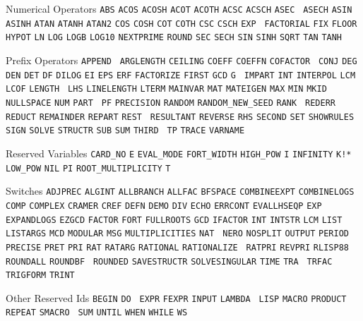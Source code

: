 \begin{list}{}
\item[Numerical Operators] {\tt ABS} {\tt ACOS}
{\tt ACOSH} {\tt ACOT} {\tt ACOTH} {\tt ACSC} {\tt ACSCH} {\tt ASEC} {\tt
ASECH} {\tt ASIN} {\tt ASINH} {\tt ATAN} {\tt ATANH} {\tt ATAN2} {\tt COS}
{\tt COSH} {\tt COT} {\tt COTH} {\tt CSC} {\tt CSCH} {\tt EXP} {\tt
FACTORIAL} {\tt FIX} {\tt FLOOR} {\tt HYPOT} {\tt LN} {\tt LOG} {\tt LOGB}
{\tt LOG10} {\tt NEXTPRIME} {\tt ROUND} {\tt SEC} {\tt SECH} {\tt SIN}
{\tt SINH} {\tt SQRT} {\tt TAN} {\tt TANH}

\item[Prefix Operators] {\tt APPEND} {\tt
ARGLENGTH} {\tt CEILING} {\tt COEFF} {\tt COEFFN} {\tt COFACTOR} {\tt
CONJ} {\tt DEG} {\tt DEN} {\tt DET} {\tt DF} {\tt DILOG} {\tt EI}
{\tt EPS} {\tt ERF} {\tt FACTORIZE} {\tt FIRST} {\tt GCD} {\tt G} {\tt
IMPART} {\tt INT} {\tt INTERPOL} {\tt LCM} {\tt LCOF} {\tt LENGTH} {\tt
LHS} {\tt LINELENGTH} {\tt LTERM} {\tt MAINVAR} {\tt MAT} {\tt MATEIGEN}
{\tt MAX} {\tt MIN} {\tt MKID} {\tt NULLSPACE} {\tt NUM} {\tt PART} {\tt
PF} {\tt PRECISION} {\tt RANDOM} {\tt RANDOM\_NEW\_SEED} {\tt RANK} {\tt
REDERR} {\tt REDUCT} {\tt REMAINDER} {\tt REPART} {\tt REST} {\tt
RESULTANT} {\tt REVERSE} {\tt RHS} {\tt SECOND} {\tt SET} {\tt SHOWRULES}
{\tt SIGN} {\tt SOLVE} {\tt STRUCTR} {\tt SUB} {\tt SUM} {\tt THIRD} {\tt
TP} {\tt TRACE} {\tt VARNAME}

\item[Reserved Variables] {\tt CARD\_NO} {\tt E} {\tt EVAL\_MODE}
{\tt FORT\_WIDTH} {\tt HIGH\_POW} {\tt I} {\tt INFINITY} {\tt K!*} {\tt
LOW\_POW} {\tt NIL} {\tt PI} {\tt ROOT\_MULTIPLICITY} {\tt T}

\item[Switches] {\tt ADJPREC} {\tt ALGINT} {\tt ALLBRANCH} {\tt ALLFAC}
{\tt BFSPACE} {\tt COMBINEEXPT} {\tt COMBINELOGS}
{\tt COMP} {\tt COMPLEX} {\tt CRAMER} {\tt CREF} {\tt DEFN} {\tt DEMO}
{\tt DIV} {\tt ECHO} {\tt ERRCONT} {\tt EVALLHSEQP} {\tt EXP} {\tt
EXPANDLOGS} {\tt EZGCD} {\tt FACTOR} {\tt FORT} {\tt FULLROOTS} {\tt GCD}
{\tt IFACTOR} {\tt INT} {\tt INTSTR} {\tt LCM} {\tt LIST} {\tt LISTARGS}
{\tt MCD} {\tt MODULAR} {\tt MSG} {\tt MULTIPLICITIES} {\tt NAT} {\tt
NERO} {\tt NOSPLIT} {\tt OUTPUT} {\tt PERIOD} {\tt PRECISE} {\tt PRET}
{\tt PRI} {\tt RAT} {\tt RATARG} {\tt RATIONAL} {\tt RATIONALIZE} {\tt
RATPRI} {\tt REVPRI} {\tt RLISP88} {\tt ROUNDALL} {\tt ROUNDBF} {\tt
ROUNDED} {\tt SAVESTRUCTR} {\tt SOLVESINGULAR} {\tt TIME} {\tt TRA} {\tt
TRFAC} {\tt TRIGFORM} {\tt TRINT}

\item[Other Reserved Ids] {\tt BEGIN} {\tt DO} {\tt
EXPR} {\tt FEXPR} {\tt INPUT} {\tt LAMBDA} {\tt
LISP} {\tt MACRO} {\tt PRODUCT} {\tt REPEAT} {\tt SMACRO} {\tt
SUM} {\tt UNTIL} {\tt WHEN} {\tt WHILE} {\tt WS}

\end{list}

